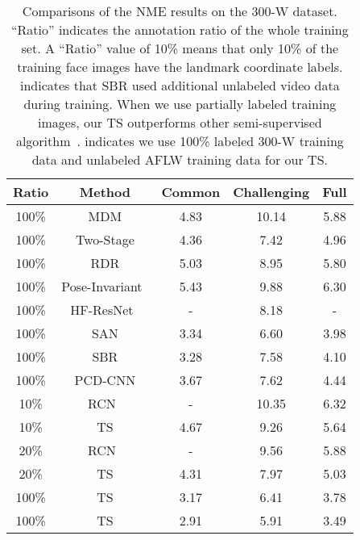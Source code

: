 \documentclass[10pt,twocolumn,letterpaper]{article}
\def\NAME{{{TS}}} \def\LLB{\textcolor{red}}
\begin{document}
\begin{table}[!t]
\setlength{\tabcolsep}{2pt}
\centering
\begin{tabular}{|c|c|c|c|c|} \hline\hline
 Ratio &      Method                                  & Common   & Challenging &  Full   \\\hline
100\% &      MDM \cite{trigeorgis2016mnemonic}       & 4.83     & 10.14       &  5.88      \\
100\% &      Two-Stage \cite{lv2017deep}             & 4.36     & 7.42        &  4.96      \\
 100\% &      RDR \cite{xiao2017recurrent}            & 5.03     & 8.95        &  5.80      \\ 
 100\% & Pose-Invariant~\cite{jourabloo2017pose}      & 5.43     & 9.88        &  6.30      \\
 100\% & HF-ResNet~\cite{ranjan2019hyperface}         &  -       & 8.18        & - \\
 100\% &      SAN \cite{dong2018san}                  & 3.34     & 6.60        &  3.98      \\
 100\% &  SBR \cite{dong2018sbr}             & 3.28     & 7.58        &  4.10      \\
 100\% &      PCD-CNN \cite{kumar2018disentangling}   & 3.67     & 7.62        &  4.44      \\\hline\hline
 10\%  & RCN~\cite{honari2018improving}         &   -      & 10.35       &  6.32      \\
 10\%  &      {\NAME}                                 & {4.67}   & {9.26}      &  {5.64}    \\\hline
 20\%  & RCN~\cite{honari2018improving}         &   -      & 9.56        &  5.88      \\
 20\%  &      {\NAME}                                 & {4.31}   & {7.97}      &  {5.03}    \\\hline
100\%       &      {\NAME}                           & 3.17     & 6.41        &  3.78    \\\hline
 100\%&      {\NAME}                      & 2.91     & 5.91        &  3.49    \\\hline
 \hline
\end{tabular}
\vspace{2mm}
\caption{
Comparisons of the NME results on the 300-W dataset. ``Ratio'' indicates the annotation ratio of the whole training set.
A ``Ratio'' value of 10\% means that only 10\% of the training face images have the landmark coordinate labels.
 indicates that SBR \cite{dong2018sbr} used additional unlabeled video data during training.
When we use partially labeled training images, our {\NAME} outperforms other semi-supervised algorithm~\cite{honari2018improving}.
 indicates we use 100\% labeled 300-W training data and unlabeled AFLW training data for our {\NAME}.
}
\label{table:300W-ALL}
\end{table}
\end{document}
